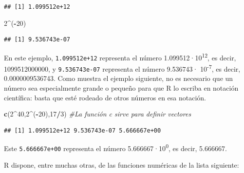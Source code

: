 \documentclass[]{book}
\newenvironment{Shaded}{\begin{snugshade}}{\end{snugshade}}
\newcommand{\CommentTok}[1]{\textcolor[rgb]{0.56,0.35,0.01}{\textit{#1}}}
\newcommand{\DecValTok}[1]{\textcolor[rgb]{0.00,0.00,0.81}{#1}}
\newcommand{\KeywordTok}[1]{\textcolor[rgb]{0.13,0.29,0.53}{\textbf{#1}}}
\newcommand{\NormalTok}[1]{#1}
\newcommand{\OperatorTok}[1]{\textcolor[rgb]{0.81,0.36,0.00}{\textbf{#1}}}
\theoremstyle{definition}
\theoremstyle{definition}
\theoremstyle{definition}
\theoremstyle{remark}
\begin{document}
\begin{verbatim}
## [1] 1.099512e+12
\end{verbatim}

\begin{Shaded}
\begin{Highlighting}[]
\DecValTok{2}\OperatorTok{^}\NormalTok{(}\OperatorTok{-}\DecValTok{20}\NormalTok{)}
\end{Highlighting}
\end{Shaded}

\begin{verbatim}
## [1] 9.536743e-07
\end{verbatim}

En este ejemplo, \texttt{1.099512e+12} representa el número 1.099512·10\textsuperscript{12}, es decir, 1099512000000, y \texttt{9.536743e-07} representa el número 9.536743· 10\textsuperscript{-7}, es decir,
0.0000009536743. Como muestra el ejemplo siguiente, no es necesario que un número sea especialmente grande o pequeño
para que R lo escriba en notación científica: basta que esté rodeado de otros números en esa notación.

\begin{Shaded}
\begin{Highlighting}[]
\KeywordTok{c}\NormalTok{(}\DecValTok{2}\OperatorTok{^}\DecValTok{40}\NormalTok{,}\DecValTok{2}\OperatorTok{^}\NormalTok{(}\OperatorTok{-}\DecValTok{20}\NormalTok{),}\DecValTok{17}\OperatorTok{/}\DecValTok{3}\NormalTok{) }\CommentTok{#La función c sirve para definir vectores}
\end{Highlighting}
\end{Shaded}

\begin{verbatim}
## [1] 1.099512e+12 9.536743e-07 5.666667e+00
\end{verbatim}

Este \texttt{5.666667e+00} representa el número 5.666667·10\textsuperscript{0}, es decir,
5.666667.

R dispone, entre muchas otras, de las funciones numéricas de la lista siguiente:
\end{document}
